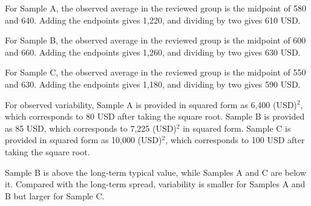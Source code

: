 \begin{ExamProblems}
		For Sample A, the observed average in the reviewed group is the midpoint of 580 and 640.
		Adding the endpoints gives 1,220, and dividing by two gives 610 USD.

		For Sample B, the observed average in the reviewed group is the midpoint of 600 and 660.
		Adding the endpoints gives 1,260, and dividing by two gives 630 USD.

		For Sample C, the observed average in the reviewed group is the midpoint of 550 and 630.
		Adding the endpoints gives 1,180, and dividing by two gives 590 USD.

		For observed variability, Sample A is provided in squared form as 6,400 (USD)$^2$, which corresponds to 80 USD after taking the square root.
		Sample B is provided as 85 USD, which corresponds to 7,225 (USD)$^2$ in squared form.
		Sample C is provided in squared form as 10,000 (USD)$^2$, which corresponds to 100 USD after taking the square root.

		Sample B is above the long-term typical value, while Samples A and C are below it.
		Compared with the long-term spread, variability is smaller for Samples A and B but larger for Sample C.


		\end{ExamProblems}


